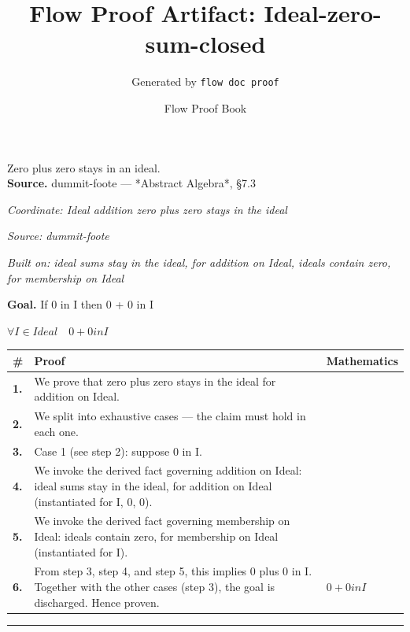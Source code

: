 \documentclass[11pt]{article}
\title{Flow Proof Artifact: Ideal-zero-sum-closed}
\author{Generated by \texttt{flow doc proof}}
\date{Flow Proof Book}
\theoremstyle{definition}
\begin{document}
\maketitle
Zero plus zero stays in an ideal.\\[0.5em]
\textbf{Source.} dummit-foote — *Abstract Algebra*, §7.3\\[0.5em]
\bigskip
{}\par
\smallskip\noindent\textit{Coordinate: Ideal \cdot addition \cdot zero plus zero stays in the ideal}\par
\smallskip\noindent\textit{Source: dummit-foote}\par
\smallskip\noindent\textit{Built on: ideal sums stay in the ideal, for addition on Ideal, ideals contain zero, for membership on Ideal}\par
\medskip
\noindent\textbf{Goal.} If 0 in I then 0 + 0 in I\par
\noindent$\displaystyle \forall I \in Ideal\quad 0 + 0 in I$\par
\medskip
\noindent
\begin{tabular}{@{} >{\raggedright\arraybackslash}p{} >{\raggedright\arraybackslash}p{} >{\raggedleft\arraybackslash}p{} @{}}
\textbf{\#} & \textbf{Proof} & \textbf{Mathematics} \\
\midrule
\textbf{1.} & We prove that zero plus zero stays in the ideal for addition on Ideal. & \\[0.45em]
\textbf{2.} & We split into exhaustive cases — the claim must hold in each one. & \\[0.45em]
\textbf{3.} & Case 1 (see step 2): suppose 0 in I. & \\[0.45em]
\textbf{4.} & We invoke the derived fact governing addition on Ideal: ideal sums stay in the ideal, for addition on Ideal (instantiated for I, 0, 0). & \\[0.45em]
\textbf{5.} & We invoke the derived fact governing membership on Ideal: ideals contain zero, for membership on Ideal (instantiated for I). & \\[0.45em]
\textbf{6.} & From step 3, step 4, and step 5, this implies 0 plus 0 in I. Together with the other cases (step 3), the goal is discharged. Hence proven. & $\displaystyle 0 + 0 in I$ \\[0.45em]
\bottomrule
\end{tabular}
\label{thm:Ideal-addition-zero_plus_zero_stays_in_the_ideal}
\par\medskip\hrule
\end{document}
